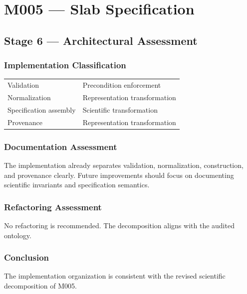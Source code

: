 \chapter{M005 --- Slab Specification}

\section{Stage 6 --- Architectural Assessment}

\subsection{Implementation Classification}

\begin{tabular}{|l|l|}
\hline
Validation & Precondition enforcement\\
Normalization & Representation transformation\\
Specification assembly & Scientific transformation\\
Provenance & Representation transformation\\
\hline
\end{tabular}

\subsection{Documentation Assessment}

The implementation already separates validation, normalization,
construction, and provenance clearly. Future improvements should focus
on documenting scientific invariants and specification semantics.

\subsection{Refactoring Assessment}

No refactoring is recommended. The decomposition aligns with the audited
ontology.

\subsection{Conclusion}

The implementation organization is consistent with the revised
scientific decomposition of M005.
